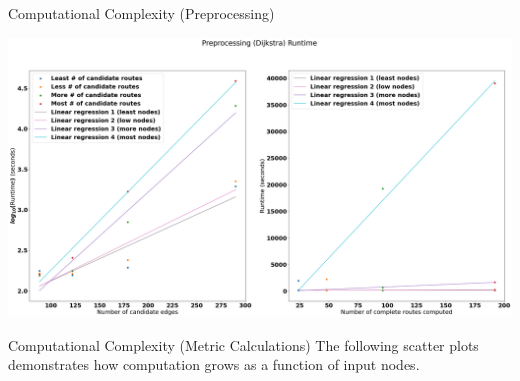 \documentclass[aspectratio=169, bigfiles, professionalfonts, hyperref={colorlinks=true, allcolors=., urlcolor=blue}]{beamer}
\begin{document}
\begin{frame}{Computational Complexity (Preprocessing)}
    
        \centering
    \includegraphics[scale=0.18]{Jupyter Notebook LaTeX/preprocessing.png}
    
    
\end{frame}

\begin{frame}{Computational Complexity (Metric Calculations)}
    The following scatter plots demonstrates how computation grows as a function of input nodes.
\end{frame}
\end{document}

